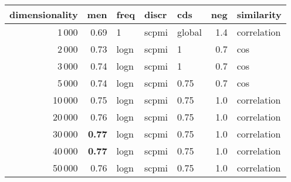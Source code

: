 \begin{tabular}{rrlllrl}
\toprule
 dimensionality &   men &  freq &  discr &     cds &  neg &   similarity \\
\midrule
           1\,000 &  0.69 &     1 &  scpmi &  global &  1.4 &  correlation \\
           2\,000 &  0.73 &  logn &  scpmi &       1 &  0.7 &          cos \\
           3\,000 &  0.74 &  logn &  scpmi &       1 &  0.7 &          cos \\
           5\,000 &  0.74 &  logn &  scpmi &    0.75 &  0.7 &          cos \\
          10\,000 &  0.75 &  logn &  scpmi &    0.75 &  1.0 &  correlation \\
          20\,000 &  0.76 &  logn &  scpmi &    0.75 &  1.0 &  correlation \\
          30\,000 &  \textbf{0.77} &  logn &  scpmi &    0.75 &  1.0 &  correlation \\
          40\,000 &  \textbf{0.77} &  logn &  scpmi &    0.75 &  1.0 &  correlation \\
          50\,000 &  0.76 &  logn &  scpmi &    0.75 &  1.0 &  correlation \\
\bottomrule
\end{tabular}
